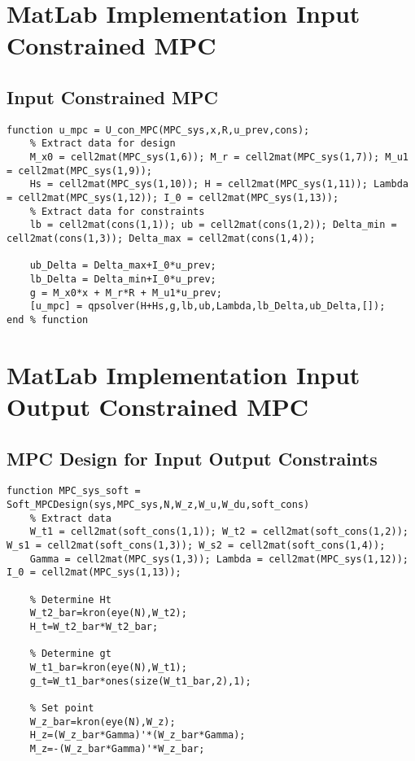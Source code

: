 \begin{bilag}
\begin{appendices}
\section{MatLab Implementation Input Constrained MPC}
\subsection{Input Constrained MPC}
\label{app:U_con_MPC}
\begin{lstlisting}[breaklines]
function u_mpc = U_con_MPC(MPC_sys,x,R,u_prev,cons);
    % Extract data for design
    M_x0 = cell2mat(MPC_sys(1,6)); M_r = cell2mat(MPC_sys(1,7)); M_u1 = cell2mat(MPC_sys(1,9));
    Hs = cell2mat(MPC_sys(1,10)); H = cell2mat(MPC_sys(1,11)); Lambda = cell2mat(MPC_sys(1,12)); I_0 = cell2mat(MPC_sys(1,13));
    % Extract data for constraints
    lb = cell2mat(cons(1,1)); ub = cell2mat(cons(1,2)); Delta_min = cell2mat(cons(1,3)); Delta_max = cell2mat(cons(1,4));

    ub_Delta = Delta_max+I_0*u_prev;
    lb_Delta = Delta_min+I_0*u_prev;
    g = M_x0*x + M_r*R + M_u1*u_prev;
    [u_mpc] = qpsolver(H+Hs,g,lb,ub,Lambda,lb_Delta,ub_Delta,[]);
end % function
\end{lstlisting}

\section{MatLab Implementation Input Output Constrained MPC}
\subsection{MPC Design for Input Output Constraints}
\label{app:InOut_Design}
\begin{lstlisting}[breaklines]
function MPC_sys_soft = Soft_MPCDesign(sys,MPC_sys,N,W_z,W_u,W_du,soft_cons)
    % Extract data
    W_t1 = cell2mat(soft_cons(1,1)); W_t2 = cell2mat(soft_cons(1,2)); W_s1 = cell2mat(soft_cons(1,3)); W_s2 = cell2mat(soft_cons(1,4));
    Gamma = cell2mat(MPC_sys(1,3)); Lambda = cell2mat(MPC_sys(1,12)); I_0 = cell2mat(MPC_sys(1,13));

    % Determine Ht
    W_t2_bar=kron(eye(N),W_t2);
    H_t=W_t2_bar*W_t2_bar;
        
    % Determine gt
    W_t1_bar=kron(eye(N),W_t1);
    g_t=W_t1_bar*ones(size(W_t1_bar,2),1);
    
    % Set point
    W_z_bar=kron(eye(N),W_z);
    H_z=(W_z_bar*Gamma)'*(W_z_bar*Gamma);
    M_z=-(W_z_bar*Gamma)'*W_z_bar;
    

\end{lstlisting}
\end{appendices}
\end{bilag}
